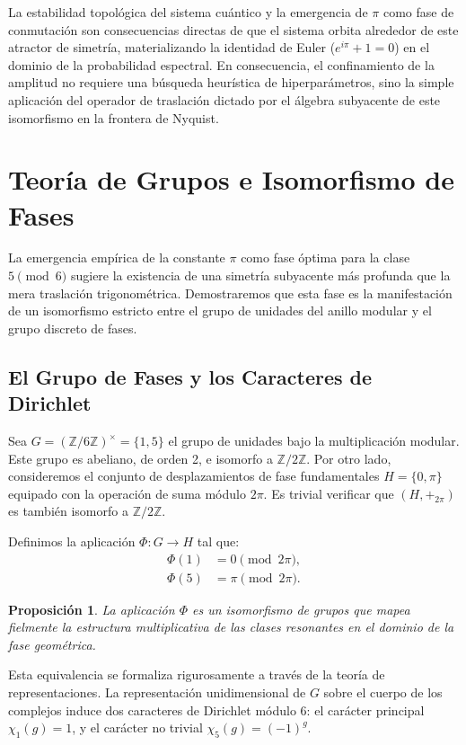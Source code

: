 \documentclass[12pt,a4paper]{article}
\theoremstyle{plain}
\newtheorem{proposicion}[teorema]{Proposición}
\theoremstyle{definition}
\theoremstyle{remark}
\begin{document}
La estabilidad topológica del sistema cuántico y la emergencia de $\pi$ como fase de conmutación son consecuencias directas de que el sistema orbita alrededor de este atractor de simetría, materializando la identidad de Euler ($e^{i\pi} + 1 = 0$) en el dominio de la probabilidad espectral. En consecuencia, el confinamiento de la amplitud no requiere una búsqueda heurística de hiperparámetros, sino la simple aplicación del operador de traslación dictado por el álgebra subyacente de este isomorfismo en la frontera de Nyquist.

\section{Teoría de Grupos e Isomorfismo de Fases}

La emergencia empírica de la constante $\pi$ como fase óptima para la clase $5 \pmod 6$ sugiere la existencia de una simetría subyacente más profunda que la mera traslación trigonométrica. Demostraremos que esta fase es la manifestación de un isomorfismo estricto entre el grupo de unidades del anillo modular y el grupo discreto de fases.

\subsection{El Grupo de Fases y los Caracteres de Dirichlet}

Sea $G = (\mathbb{Z}/6\mathbb{Z})^{\times} = \{1,5\}$ el grupo de unidades bajo la multiplicación modular. Este grupo es abeliano, de orden 2, e isomorfo a $\mathbb{Z}/2\mathbb{Z}$. Por otro lado, consideremos el conjunto de desplazamientos de fase fundamentales $H = \{0, \pi\}$ equipado con la operación de suma módulo $2\pi$. Es trivial verificar que $(H, +_{2\pi})$ es también isomorfo a $\mathbb{Z}/2\mathbb{Z}$.

Definimos la aplicación $\Phi: G \to H$ tal que:
\begin{align}
\Phi(1) &= 0 \pmod{2\pi}, \\
\Phi(5) &= \pi \pmod{2\pi}.
\end{align}

\begin{proposicion}
La aplicación $\Phi$ es un isomorfismo de grupos que mapea fielmente la estructura multiplicativa de las clases resonantes en el dominio de la fase geométrica.
\end{proposicion}

Esta equivalencia se formaliza rigurosamente a través de la teoría de representaciones. La representación unidimensional de $G$ sobre el cuerpo de los complejos induce dos caracteres de Dirichlet módulo 6: el carácter principal $\chi_1(g) = 1$, y el carácter no trivial $\chi_5(g) = (-1)^g$. 
\end{document}
